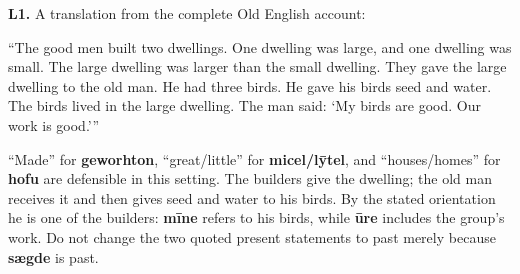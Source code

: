 \par\begin{minipage}{\linewidth}\raggedright
\textbf{L1.} A translation from the complete Old English account:

“The good men built two dwellings. One dwelling was large, and one dwelling was small. The large dwelling was larger than the small dwelling. They gave the large dwelling to the old man. He had three birds. He gave his birds seed and water. The birds lived in the large dwelling. The man said: ‘My birds are good. Our work is good.’”

“Made” for \textbf{geworhton}, “great/\allowbreak{}little” for \textbf{micel/\allowbreak{}lȳtel}, and “houses/\allowbreak{}homes” for \textbf{hofu} are defensible in this setting. The builders give the dwelling; the old man receives it and then gives seed and water to his birds. By the stated orientation he is one of the builders: \textbf{mīne} refers to his birds, while \textbf{ūre} includes the group’s work. Do not change the two quoted present statements to past merely because \textbf{sægde} is past.

\end{minipage}\par\addvspace{4pt}

